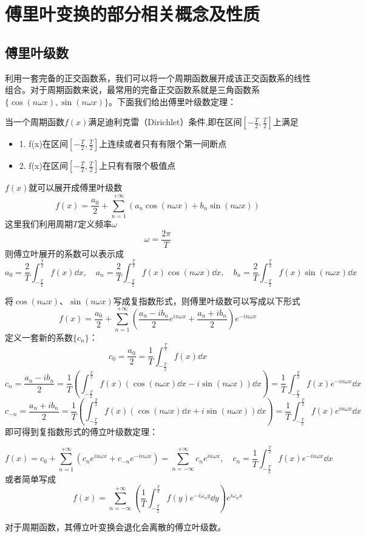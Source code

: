 \section{傅里叶变换的部分相关概念及性质}

\subsection{傅里叶级数}
利用一套完备的正交函数系，我们可以将一个周期函数展开成该正交函数系的线性组合。对于周期函数来说，最常用的完备正交函数系就是三角函数系$\{\cos(n\omega x),\sin(n\omega x)\}$。下面我们给出傅里叶级数定理：
\begin{theorem}[傅里叶级数定理]
当一个周期函数$f(x)$满足迪利克雷（Dirichlet）条件,即在区间${[-\frac{T}{2},\frac{T}{2}]}$上满足
\begin{itemize}
    \item 1. f(x)在区间${[-\frac{T}{2},\frac{T}{2}]}$上连续或者只有有限个第一间断点
    \item 2. f(x)在区间${[-\frac{T}{2},\frac{T}{2}]}$上只有有限个极值点
\end{itemize}
$f(x)$就可以展开成傅里叶级数
\[f(x)=\frac{a_0}{2}+\sum_{n=1}^{+\infty}(a_n\cos(n\omega x)+b_n\sin(n\omega x))\]
这里我们利用周期$T$定义频率$\omega$
\[\omega=\frac{2\pi}{T}\]
则傅立叶展开的系数可以表示成
\[a_0=\frac{2}{T}\int_{-\frac{T}{2}}^{\frac{T}{2}}f(x)\dd{x}, \quad a_n=\frac{2}{T}\int_{-\frac{T}{2}}^{\frac{T}{2}}f(x)\cos(n\omega x)\dd{x}, \quad b_n=\frac{2}{T}\int_{-\frac{T}{2}}^{\frac{T}{2}}f(x)\sin(n\omega x)\dd{x}\]
\end{theorem}
将$\cos(n\omega x)$、$\sin(n\omega x)$写成复指数形式，则傅里叶级数可以写成以下形式
\[f(x)=\frac{a_0}{2}+\sum_{n=1}^{+\infty}(\frac{a_n-ib_n}{2}e^{in\omega x}+\frac{a_n+ib_n}{2})e^{-in\omega x}\]
定义一套新的系数$\{c_n\}$：
\[c_0=\frac{a_0}{2}=\frac{1}{T}\int_{-\frac{T}{2}}^{\frac{T}{2}}f(x)\dd{x}\]
\[c_n=\frac{a_n-ib_n}{2}=\frac{1}{T}(\int_{-\frac{T}{2}}^{\frac{T}{2}}f(x)(\cos(n\omega x)\dd{x}-i\sin(n\omega x))\dd{x})=\frac{1}{T}\int_{-\frac{T}{2}}^{\frac{T}{2}}f(x)e^{-in\omega x}\dd{x}\]
\[c_{-n}=\frac{a_n+ib_n}{2}=\frac{1}{T}(\int_{-\frac{T}{2}}^{\frac{T}{2}}f(x)(\cos(n\omega x)\dd{x}+i\sin(n\omega x))\dd{x})=\frac{1}{T}\int_{-\frac{T}{2}}^{\frac{T}{2}}f(x)e^{in\omega x}\dd{x}\]
即可得到复指数形式的傅立叶级数定理：
\begin{theorem}[复指数形式的傅里叶级数定理]
\[f(x)=c_0+\sum_{n=1}^{+\infty}(c_ne^{in\omega x}+c_{-n}e^{-in\omega x})=\sum_{n=-\infty}^{+\infty}c_ne^{in\omega x}, \quad c_n=\frac{1}{T}\int_{-\frac{T}{2}}^{\frac{T}{2}}f(x)e^{-in\omega x}\dd{x}\]
或者简单写成
\[f(x)=\sum_{n=-\infty}^{+\infty}(\frac{1}{T}\int_{-\frac{T}{2}}^{\frac{T}{2}}f(y)e^{-i\omega_n y}\dd{y})e^{i\omega_n x}\]
\end{theorem}
对于周期函数，其傅立叶变换会退化会离散的傅立叶级数。

